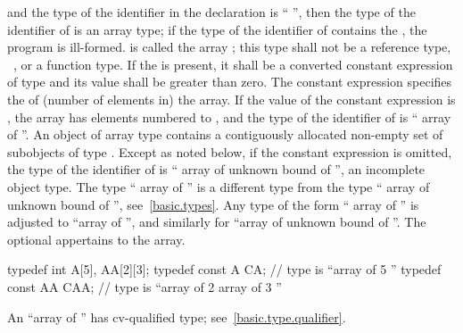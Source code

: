 and the type of the identifier in the declaration
is
``
'',
then the type of the identifier of
is an array type; if the type of the identifier of 
contains the  ,
the program is ill-formed.
is called the array
;
this type shall not be a reference type, \cv{}~,
or a function type.
%
If the
is present, it shall be a converted constant
expression of type  and
its value shall be greater than zero.
The constant expression specifies the
%
%
of (number of elements in) the array.
If the value of the constant expression is
,
the array has
elements numbered
to
,
and the type of the identifier of
is `` array of
''.
An object of array type contains a contiguously allocated non-empty set of
subobjects of type
.
Except as noted below, if
the constant expression is omitted, the type of the identifier of
is `` array of unknown bound of
'',
an incomplete object type.
The type `` array of
''
is a different type from the type
`` array of unknown bound of
'',
see~\ref{basic.types}.
Any type of the form
`` array of
''
is adjusted to
``array of
'',
and similarly for
``array of unknown bound of
''.
The optional  appertains to the array.
\begin{example}

\begin{codeblock}
typedef int A[5], AA[2][3];
typedef const A CA;             // type is ``array of 5 ''
typedef const AA CAA;           // type is ``array of 2 array of 3 ''
\end{codeblock}
\end{example}
\begin{note}
An
``array of
''
has cv-qualified type; see~\ref{basic.type.qualifier}.
\end{note}

